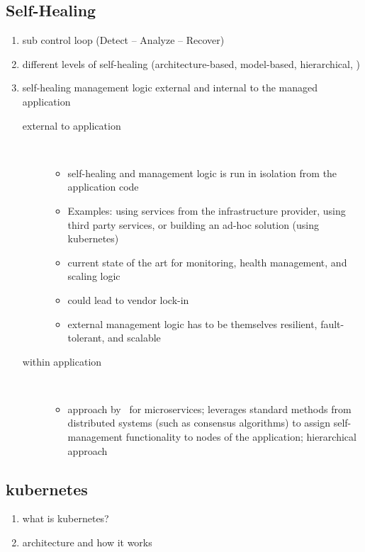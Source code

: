 \subsection{Self-Healing}
  \begin{enumerate}
    \item sub control loop (Detect -- Analyze -- Recover)
    \item different levels of self-healing (architecture-based, model-based, hierarchical, \etc)
    \item self-healing management logic external and internal to the managed application
      \begin{description}
        \item[external to application]\hfill\\
          \begin{itemize}
            \item self-healing and management logic is run in isolation from the application code
            \item Examples: using services from the infrastructure provider, using third party services, or building an ad-hoc solution (\eg using \gls{kubernetes})~\cite{ToffettiMicroservices}
            \item current state of the art for monitoring, health management, and scaling logic
            \item could lead to vendor lock-in
            \item external management logic has to be themselves resilient, fault-tolerant, and scalable
          \end{itemize}
        \item[within application]\hfill\\
        \begin{itemize}
          \item approach by~\citeauthor{ToffettiMicroservices} for microservices; leverages standard methods from distributed systems (such as consensus algorithms) to assign self-management functionality to nodes of the application; hierarchical approach~\cite{ToffettiMicroservices}
        \end{itemize}
      \end{description}
  \end{enumerate}

\subsection[Kubernetes]{\gls{kubernetes}}
  \begin{enumerate}
    \item what is \gls{kubernetes}?
    \item architecture and how it works
  \end{enumerate}

